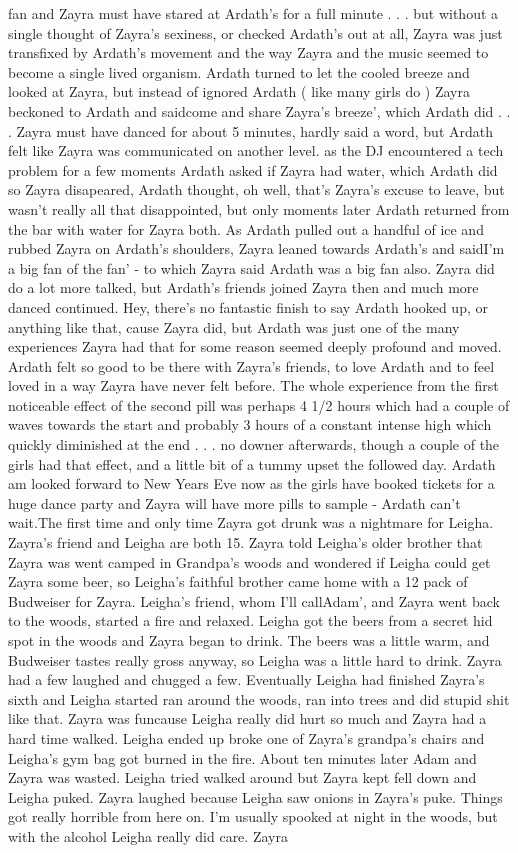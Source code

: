 \documentclass[12pt]{book}
\begin{document}
fan and Zayra must have stared at Ardath's for a full minute  . . .  but without a single thought of Zayra's sexiness, or checked Ardath's out at all, Zayra was just transfixed by Ardath's movement and the way Zayra and the music seemed to become a single lived organism. Ardath turned to let the cooled breeze and looked at Zayra, but instead of ignored Ardath ( like many girls do ) Zayra beckoned to Ardath and saidcome and share Zayra's breeze', which Ardath did  . . .  Zayra must have danced for about 5 minutes, hardly said a word, but Ardath felt like Zayra was communicated on another level. as the DJ encountered a tech problem for a few moments Ardath asked if Zayra had water, which Ardath did so Zayra disapeared, Ardath thought, oh well, that's Zayra's excuse to leave, but wasn't really all that disappointed, but only moments later Ardath returned from the bar with water for Zayra both. As Ardath pulled out a handful of ice and rubbed Zayra on Ardath's shoulders, Zayra leaned towards Ardath's and saidI'm a big fan of the fan' - to which Zayra said Ardath was a big fan also. Zayra did do a lot more talked, but Ardath's friends joined Zayra then and much more danced continued. Hey, there's no fantastic finish to say Ardath hooked up, or anything like that, cause Zayra did, but Ardath was just one of the many experiences Zayra had that for some reason seemed deeply profound and moved. Ardath felt so good to be there with Zayra's friends, to love Ardath and to feel loved in a way Zayra have never felt before. The whole experience from the first noticeable effect of the second pill was perhaps 4 1/2 hours which had a couple of waves towards the start and probably 3 hours of a constant intense high which quickly diminished at the end  . . .  no downer afterwards, though a couple of the girls had that effect, and a little bit of a tummy upset the followed day. Ardath am looked forward to New Years Eve now as the girls have booked tickets for a huge dance party and Zayra will have more pills to sample - Ardath can't wait.The first time and only time Zayra got drunk was a nightmare for Leigha. Zayra's friend and Leigha are both 15. Zayra told Leigha's older brother that Zayra was went camped in Grandpa's woods and wondered if Leigha could get Zayra some beer, so Leigha's faithful brother came home with a 12 pack of Budweiser for Zayra. Leigha's friend, whom I'll callAdam', and Zayra went back to the woods, started a fire and relaxed. Leigha got the beers from a secret hid spot in the woods and Zayra began to drink. The beers was a little warm, and Budweiser tastes really gross anyway, so Leigha was a little hard to drink. Zayra had a few laughed and chugged a few. Eventually Leigha had finished Zayra's sixth and Leigha started ran around the woods, ran into trees and did stupid shit like that. Zayra was funcause Leigha really did hurt so much and Zayra had a hard time walked. Leigha ended up broke one of Zayra's grandpa's chairs and Leigha's gym bag got burned in the fire. About ten minutes later Adam and Zayra was wasted. Leigha tried walked around but Zayra kept fell down and Leigha puked. Zayra laughed because Leigha saw onions in Zayra's puke. Things got really horrible from here on. I'm usually spooked at night in the woods, but with the alcohol Leigha really did care. Zayra 
\end{document}

